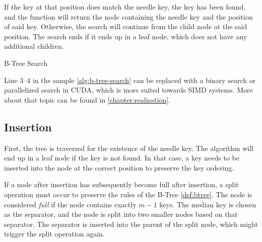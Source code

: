 If the key at that position does match the needle key, the key has been found, and the function will return the node containing the needle key and the position of said key. Otherwise, the search will continue from the child node at the said position. The search ends if it ends up in a leaf node, which does not have any additional children.

\begin{algorithm}
  \caption{B-Tree Search}\label{alg:b-tree-search}
  \DontPrintSemicolon


\end{algorithm}

Line 3--4 in the sample \cref{alg:b-tree-search} can be replaced with a binary search or parallelized search in CUDA, which is more suited towards SIMD systems. More about that topic can be found in \cref{chapter:realisation}.

\subsection{Insertion}

First, the tree is traversed for the existence of the needle key. The algorithm will end up in a leaf node if the key is not found. In that case, a key needs to be inserted into the node at the correct position to preserve the key ordering.

If a node after insertion has subsequently become full after insertion, a split operation must occur to preserve the rules of the B-Tree \cref{def:btree}. The node is considered \textit{full} if the node contains exactly $m - 1$ keys. The median key is chosen as the separator, and the node is split into two smaller nodes based on that separator. The separator is inserted into the parent of the split node, which might trigger the split operation again.

